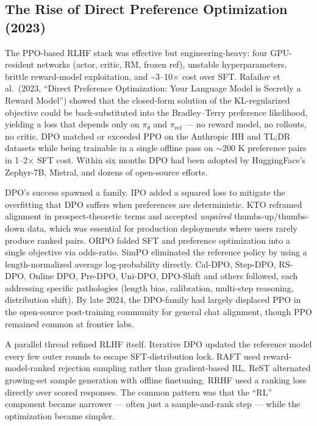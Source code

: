 \documentclass{article}
\begin{document}
\subsection{The Rise of Direct Preference Optimization (2023)}\label{the-rise-of-direct-preference-optimization-2023}

The PPO-based RLHF stack was effective but engineering-heavy: four GPU-resident networks (actor, critic, RM, frozen ref), unstable hyperparameters, brittle reward-model exploitation, and \textasciitilde3--10× cost over SFT. Rafailov et al.~(2023, ``Direct Preference Optimization: Your Language Model is Secretly a Reward Model'') showed that the closed-form solution of the KL-regularized objective could be back-substituted into the Bradley--Terry preference likelihood, yielding a loss that depends only on \(\pi_\theta\) and \(\pi_{\text{ref}}\) --- no reward model, no rollouts, no critic. DPO matched or exceeded PPO on the Anthropic HH and TL;DR datasets while being trainable in a single offline pass on $\sim$200 K preference pairs in 1--2× SFT cost. Within six months DPO had been adopted by HuggingFace's Zephyr-7B, Mistral, and dozens of open-source efforts.

DPO's success spawned a family. IPO \citep{azar2023ageneraltheoretica} added a squared loss to mitigate the overfitting that DPO suffers when preferences are deterministic. KTO \citep{ethayarajh2024ktomodelalignmenta} reframed alignment in prospect-theoretic terms and accepted \emph{unpaired} thumbs-up/thumbs-down data, which was essential for production deployments where users rarely produce ranked pairs. ORPO \citep{hong2024orpomonolithicpref} folded SFT and preference optimization into a single objective via odds-ratio. SimPO \citep{meng2024simposimpleprefere} eliminated the reference policy by using a length-normalized average log-probability directly. Cal-DPO, Step-DPO, RS-DPO, Online DPO, Pre-DPO, Uni-DPO, DPO-Shift and others followed, each addressing specific pathologies (length bias, calibration, multi-step reasoning, distribution shift). By late 2024, the DPO-family had largely displaced PPO in the open-source post-training community for general chat alignment, though PPO remained common at frontier labs.

A parallel thread refined RLHF itself. Iterative DPO \citep{xiong2023iterativepreferenc} updated the reference model every few outer rounds to escape SFT-distribution lock. RAFT \citep{dong2023raftrewardrankedfi} used reward-model-ranked rejection sampling rather than gradient-based RL. ReST \citep{gulcehre20232023} alternated growing-set sample generation with offline finetuning. RRHF \citep{yuan2023rrhfrankresponsest} used a ranking loss directly over scored responses. The common pattern was that the ``RL'' component became narrower --- often just a sample-and-rank step --- while the optimization became simpler.
\end{document}
